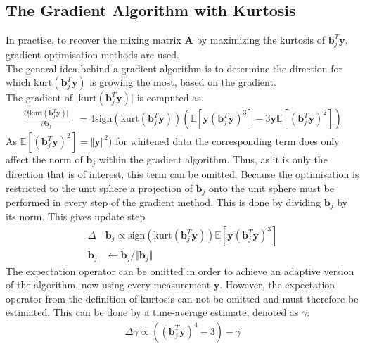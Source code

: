 \subsection{The Gradient Algorithm with Kurtosis}
In practise, to recover the mixing matrix $\textbf{A}$ by maximizing the kurtosis of $\textbf{b}_{j}^T \textbf{y}$, gradient optimisation methods are used.\\
The general idea behind a gradient algorithm is to determine the direction for which $\text{kurt}(\textbf{b}_{j}^T \textbf{y})$ is growing the most, based on the gradient. \\

The gradient of $\vert \text{kurt}(\textbf{b}_{j}^T \textbf{y}) \vert$ is computed as
\begin{align}\label{eq:kurt}
\frac{\partial \vert \text{kurt}(\textbf{b}_{j}^T \textbf{y})\vert}{\partial \mathbf{b}_j} &= 4 \text{sign}(\text{kurt}(\textbf{b}_{j}^T \textbf{y})) (\mathbb{E}[\mathbf{y} (\textbf{b}_{j}^T \textbf{y})^3] - 3 \mathbf{y} \mathbb{E}[(\textbf{b}_{j}^T \textbf{y})^2]) 
\end{align} 
As $\mathbb{E}[(\textbf{b}_{j}^T \textbf{y})^2] =\Vert \mathbf{y} \Vert^2)$ for whitened data the corresponding term does only affect the norm of $\textbf{b}_j$ within the gradient algorithm. Thus, as it is only the direction that is of interest, this term can be omitted. Because the optimisation is restricted to the unit sphere a projection of $\textbf{b}_j$ onto the unit sphere must be performed in every step of the gradient method. This is done by dividing $\textbf{b}_j$ by its norm. This gives update step 
\begin{align*}
\Delta &\textbf{b}_j \propto \text{sign}\left( \text{kurt}(\textbf{b}_{j}^T \textbf{y}) \right) \mathbb{E}[\textbf{y}(\textbf{b}_{j}^T \textbf{y})^3] \\
\textbf{b}_j &\leftarrow \textbf{b}_j/\Vert \textbf{b}_j \Vert
\end{align*}  
The expectation operator can be omitted in order to achieve an adaptive version of the algorithm, now using every measurement $\textbf{y}$. However, the expectation operator from the definition of kurtosis can not be omitted and must therefore be estimated. This can be done by a time-average estimate, denoted as $\gamma$:
\begin{align*}
\Delta \gamma \propto((\textbf{b}_{j}^T \textbf{y})^4 - 3) - \gamma
\end{align*}

